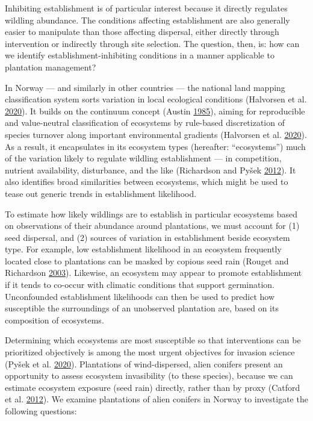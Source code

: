 \documentclass[
]{article}
\begin{document}
Inhibiting establishment is of particular interest because it directly regulates wildling abundance.
The conditions affecting establishment are also generally easier to manipulate than those affecting dispersal, either directly through intervention or indirectly through site selection.
The question, then, is: how can we identify establishment-inhibiting conditions in a manner applicable to plantation management?

In Norway --- and similarly in other countries --- the national land mapping classification system sorts variation in local ecological conditions (Halvorsen et al. \protect\hyperlink{ref-halvorsenSystematicsEcodiversityEcoSyst2020}{2020}).
It builds on the continuum concept (Austin \protect\hyperlink{ref-austinContinuumConceptOrdination1985}{1985}), aiming for reproducible and value-neutral classification of ecosystems by rule-based discretization of species turnover along important environmental gradients (Halvorsen et al. \protect\hyperlink{ref-halvorsenSystematicsEcodiversityEcoSyst2020}{2020}).
As a result, it encapsulates in its ecosystem types (hereafter: ``ecosystems'') much of the variation likely to regulate wildling establishment --- in competition, nutrient availability, disturbance, and the like (Richardson and Pyšek \protect\hyperlink{ref-richardsonNaturalizationIntroducedPlants2012}{2012}).
It also identifies broad similarities between ecosystems, which might be used to tease out generic trends in establishment likelihood.

To estimate how likely wildlings are to establish in particular ecosystems based on observations of their abundance around plantations, we must account for (1) seed dispersal, and (2) sources of variation in establishment beside ecosystem type.
For example, low establishment likelihood in an ecosystem frequently located close to plantations can be masked by copious seed rain (Rouget and Richardson \protect\hyperlink{ref-rougetInferringProcessPattern2003}{2003}).
Likewise, an ecosystem may appear to promote establishment if it tends to co-occur with climatic conditions that support germination.
Unconfounded establishment likelihoods can then be used to predict how susceptible the surroundings of an unobserved plantation are, based on its composition of ecosystems.

Determining which ecosystems are most susceptible so that interventions can be prioritized objectively is among the most urgent objectives for invasion science (Pyšek et al. \protect\hyperlink{ref-pysekScientistsWarningInvasive2020}{2020}).
Plantations of wind-dispersed, alien conifers present an opportunity to assess ecosystem invasibility (to these species), because we can estimate ecosystem exposure (seed rain) directly, rather than by proxy (Catford et al. \protect\hyperlink{ref-catfordQuantifyingLevelsBiological2012}{2012}).
We examine plantations of alien conifers in Norway to investigate the following questions:
\end{document}
